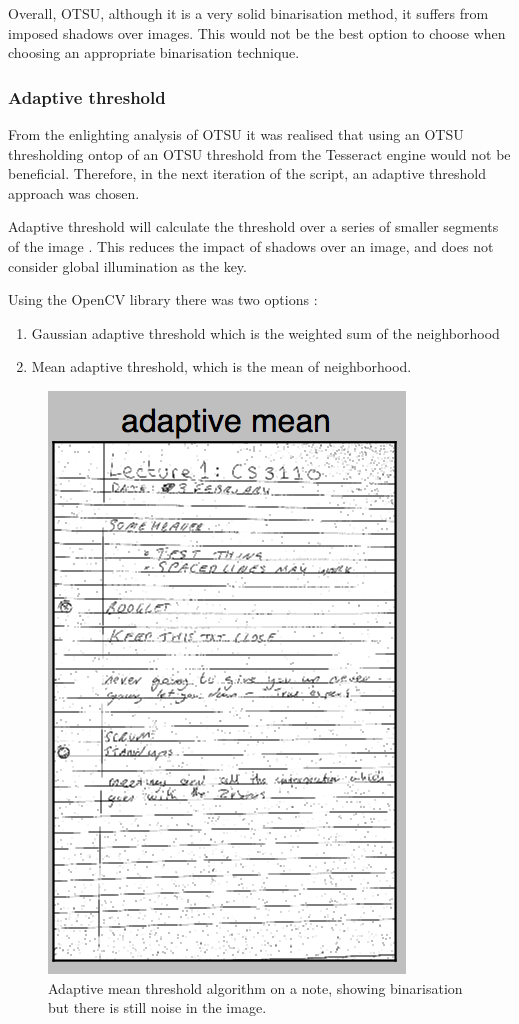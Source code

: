 Overall, OTSU, although it is a very solid binarisation method, it suffers from imposed shadows over images. This would not be the best option to choose when choosing an appropriate binarisation technique.

\subsubsection{Adaptive threshold} \label{section:threshold}
From the enlighting analysis of OTSU it was realised that using an OTSU thresholding ontop of an OTSU threshold from the Tesseract engine would not be beneficial. Therefore, in the next iteration of the script, an adaptive threshold approach was chosen.

Adaptive threshold will calculate the threshold over a series of smaller segments of the image \cite{citeulike:14021401}. This reduces the impact of shadows over an image, and does not consider global illumination as the key.

Using the OpenCV library there was two options \cite{citeulike:1402140}:
\begin{enumerate}
  \item Gaussian adaptive threshold which is the weighted sum of the neighborhood
  \item Mean adaptive threshold, which is the mean of neighborhood.
\end{enumerate}

\begin{figure}[H]
  \centering
  \includegraphics{images/adaptive_mean}
  \caption{Adaptive mean threshold algorithm on a note, showing binarisation but there is still noise in the image.}
  \label{fig:adaptive_mean}
\end{figure}

